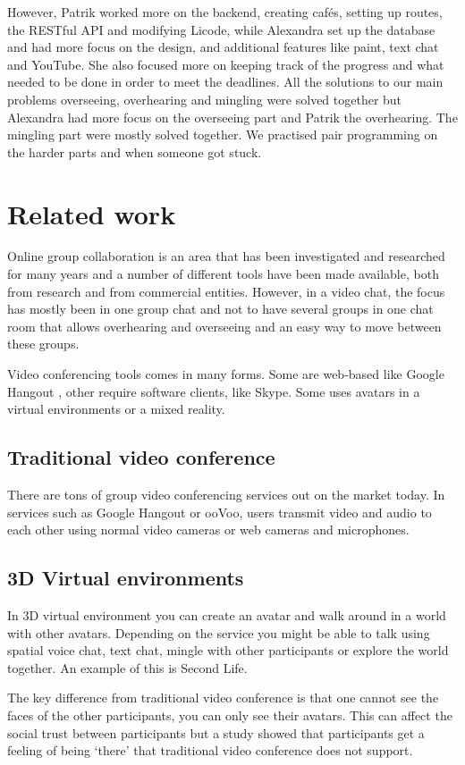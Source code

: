 \documentclass[12pt, titlepage]{article}
\begin{document}
However, Patrik worked more on the backend, creating cafés, setting up routes, the RESTful API and modifying Licode, while Alexandra set up the database and had more focus on the design, and additional features like paint, text chat and YouTube. She also focused more on keeping track of the progress and what needed to be done in order to meet the deadlines. All the solutions to our main problems overseeing, overhearing and mingling were solved together but Alexandra had more focus on the overseeing part and Patrik the overhearing. The mingling part were mostly solved together. We practised pair programming on the harder parts and when someone got stuck.
\section{Related work}
Online group collaboration is an area that has been investigated and researched for many years and a number of different tools have been made available, both from research and from commercial entities. However, in a video chat, the focus has mostly been in one group chat and not to have several groups in one chat room that allows overhearing and overseeing and an easy way to move between these groups.

Video conferencing tools comes in many forms. Some are web-based like Google Hangout \cite{2}, other require software clients, like Skype\cite{3}. Some uses avatars in a virtual environments or a mixed reality.
\subsection{Traditional video conference}
There are tons of group video conferencing services out on the market today. In services such as Google Hangout\cite{2} or ooVoo\cite{4}, users transmit video and audio to each other using normal video cameras or web cameras and microphones.
\subsection{3D Virtual environments}
In 3D virtual environment you can create an avatar and walk around in a world with other avatars. Depending on the service you might be able to talk using spatial voice chat, text chat, mingle with other participants or explore the world together. An example of this is Second Life\cite{5}.

The key difference from traditional video conference is that one cannot see the faces of the other participants, you can only see their avatars. This can affect the social trust between participants but a study showed that participants get a feeling of being ‘there’ that traditional video conference does not support\cite{6}.
\end{document}
